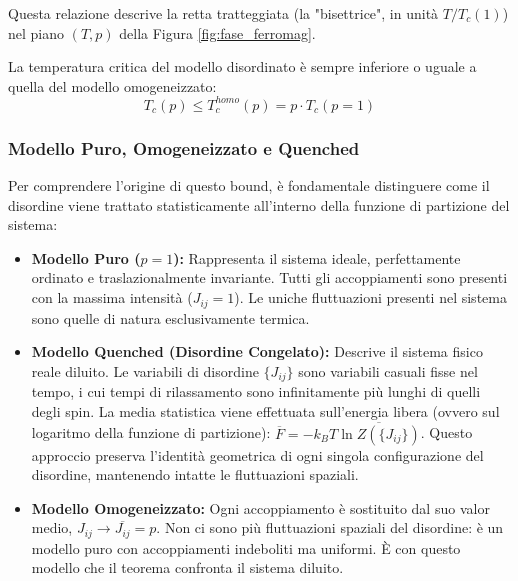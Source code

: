 \noindent Questa relazione descrive la retta tratteggiata (la "bisettrice", in unità $T/T_c(1)$) nel piano $(T, p)$ della Figura \ref{fig:fase_ferromag}.

\begin{tcolorbox}[colback=yellow!10, colframe=yellow!60!colorG, , coltitle=black, title=\textbf{Teorema}]
La temperatura critica del modello disordinato è sempre inferiore o uguale a quella del modello omogeneizzato:
\begin{equation}
T_c(p) \le T_c^{homo}(p) = p \cdot T_c(p=1)
\end{equation}
\end{tcolorbox}

\subsubsection*{Modello Puro, Omogeneizzato e Quenched}

Per comprendere l'origine di questo bound, è fondamentale distinguere come il disordine viene trattato statisticamente all'interno della funzione di partizione del sistema:
\begin{itemize}
    \item \textbf{Modello Puro ($p=1$):} Rappresenta il sistema ideale, perfettamente ordinato e traslazionalmente invariante. Tutti gli accoppiamenti sono presenti con la massima intensità ($J_{ij} = 1$). Le uniche fluttuazioni presenti nel sistema sono quelle di natura esclusivamente termica.
    \item \textbf{Modello Quenched (Disordine Congelato):} Descrive il sistema fisico reale diluito. Le variabili di disordine $\{J_{ij}\}$ sono variabili casuali fisse nel tempo, i cui tempi di rilassamento sono infinitamente più lunghi di quelli degli spin. La media statistica viene effettuata sull'energia libera (ovvero sul logaritmo della funzione di partizione): $\overline{F} = -k_B T \overline{\ln Z(\{J_{ij}\})}$. Questo approccio preserva l'identità geometrica di ogni singola configurazione del disordine, mantenendo intatte le fluttuazioni spaziali.
    \item \textbf{Modello Omogeneizzato:} Ogni accoppiamento è sostituito dal suo valor medio, $J_{ij} \to \overline{J_{ij}} = p$. Non ci sono più fluttuazioni spaziali del disordine: è un modello puro con accoppiamenti indeboliti ma uniformi. È con questo modello che il teorema confronta il sistema diluito.
\end{itemize}

